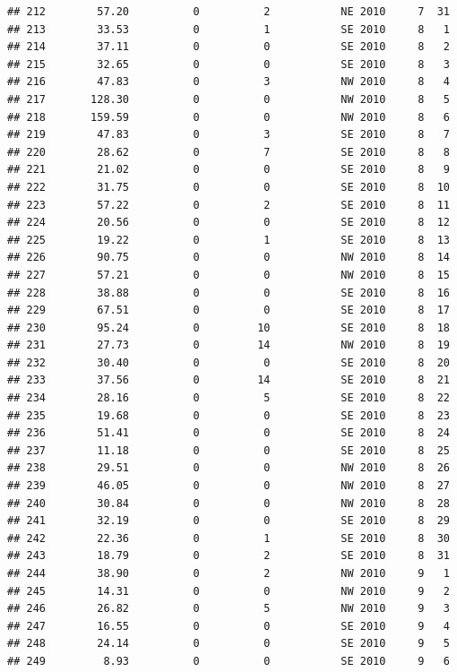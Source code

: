 \documentclass[
]{article}
\begin{document}
\begin{verbatim}
## 212        57.20          0          2           NE 2010     7  31
## 213        33.53          0          1           SE 2010     8   1
## 214        37.11          0          0           SE 2010     8   2
## 215        32.65          0          0           SE 2010     8   3
## 216        47.83          0          3           NW 2010     8   4
## 217       128.30          0          0           NW 2010     8   5
## 218       159.59          0          0           NW 2010     8   6
## 219        47.83          0          3           SE 2010     8   7
## 220        28.62          0          7           SE 2010     8   8
## 221        21.02          0          0           SE 2010     8   9
## 222        31.75          0          0           SE 2010     8  10
## 223        57.22          0          2           SE 2010     8  11
## 224        20.56          0          0           SE 2010     8  12
## 225        19.22          0          1           SE 2010     8  13
## 226        90.75          0          0           NW 2010     8  14
## 227        57.21          0          0           NW 2010     8  15
## 228        38.88          0          0           SE 2010     8  16
## 229        67.51          0          0           SE 2010     8  17
## 230        95.24          0         10           SE 2010     8  18
## 231        27.73          0         14           NW 2010     8  19
## 232        30.40          0          0           SE 2010     8  20
## 233        37.56          0         14           SE 2010     8  21
## 234        28.16          0          5           SE 2010     8  22
## 235        19.68          0          0           SE 2010     8  23
## 236        51.41          0          0           SE 2010     8  24
## 237        11.18          0          0           SE 2010     8  25
## 238        29.51          0          0           NW 2010     8  26
## 239        46.05          0          0           NW 2010     8  27
## 240        30.84          0          0           NW 2010     8  28
## 241        32.19          0          0           SE 2010     8  29
## 242        22.36          0          1           SE 2010     8  30
## 243        18.79          0          2           SE 2010     8  31
## 244        38.90          0          2           NW 2010     9   1
## 245        14.31          0          0           NW 2010     9   2
## 246        26.82          0          5           NW 2010     9   3
## 247        16.55          0          0           SE 2010     9   4
## 248        24.14          0          0           SE 2010     9   5
## 249         8.93          0          0           SE 2010     9   6

\end{verbatim}
\end{document}
